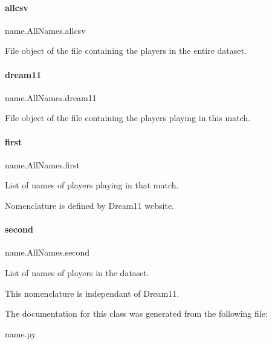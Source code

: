 \paragraph{\texorpdfstring{allcsv}{allcsv}}
{\footnotesize\ttfamily name.\+All\+Names.\+allcsv}



File object of the file containing the players in the entire dataset. 

\mbox{\label{classname_1_1AllNames_a3fe1dd6f5e33b95faf2eca8d8dce3cc1}} 
\paragraph{\texorpdfstring{dream11}{dream11}}
{\footnotesize\ttfamily name.\+All\+Names.\+dream11}



File object of the file containing the players playing in this match. 

\mbox{\label{classname_1_1AllNames_af05034a1d261190ebd396ee615052d8e}} 
\paragraph{\texorpdfstring{first}{first}}
{\footnotesize\ttfamily name.\+All\+Names.\+first}



List of names of players playing in that match. 

Nomenclature is defined by Dream11 website. \mbox{\label{classname_1_1AllNames_a414e627444762afcc47ead0015f1dcce}} 
\paragraph{\texorpdfstring{second}{second}}
{\footnotesize\ttfamily name.\+All\+Names.\+second}



List of names of players in the dataset. 

This nomenclature is independant of Dream11. 

The documentation for this class was generated from the following file\+:\begin{DoxyCompactItemize}
\item 
name.\+py\end{DoxyCompactItemize}
